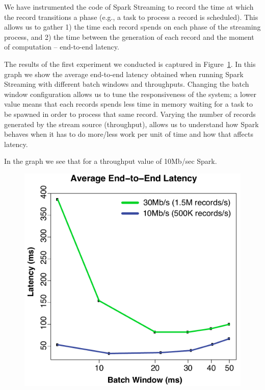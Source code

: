 We have instrumented the code of Spark Streaming to record the time at which the record transitions a phase (e.g., a task to process a record is scheduled).
This allows us to gather 1) the time each record spends on each phase of the streaming process, and 2) the time between the generation of each record and the moment of computation -- end-to-end latency.


The results of the first experiment we conducted is captured in Figure~\ref{fig:Batchsize_vs_latency}.
In this graph we show the average end-to-end latency obtained when running Spark Streaming with different batch windows and throughputs. 
Changing the batch window configuration allows us to tune the responsiveness of the system; a lower value means that each records spends less time in memory waiting for a task to be spawned in order to process that same record. 
Varying the number of records generated by the stream source (throughput), allows us to understand how 
Spark behaves when it has to do more/less work per unit of time and how that affects latency.

In the graph we see that for a throughput value of 10Mb/sec Spark.

\begin{figure}[t!]
  \begin{center}
    \includegraphics[scale=0.45]{images_graphs/batchsize_vs_latency/batchsize_vs_latency3.pdf}
  \end{center}
  \caption{}
  \label{fig:Batchsize_vs_latency}
\end{figure}
